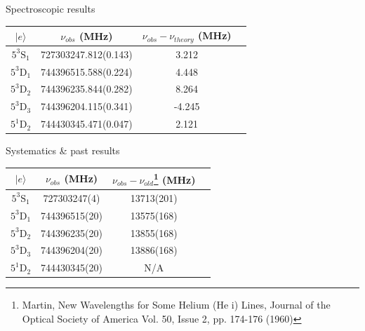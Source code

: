 \documentclass{beamer}
\begin{document}
\begin{frame}{Spectroscopic results}
    \begin{center}
        \begin{tabular}{|c||c|c|c|}
        \hline
            $|e\rangle$ &  $\nu_{obs}$ (MHz)    &$\nu_{obs}-\nu_{theory}$ (MHz) \\
            \hline\hline
            $5^3\mathrm{S}_1$ & 727303247.812(0.143)    & 3.212\\
            $5^3\mathrm{D}_1$ & 744396515.588(0.224)     & 4.448\\
            $5^3\mathrm{D}_2$ & 744396235.844(0.282)   & 8.264\\
            $5^3\mathrm{D}_3$ & 744396204.115(0.341)   &-4.245\\
            $5^1\mathrm{D}_2$ & 744430345.471(0.047)     &	2.121\\
            \hline
        \end{tabular}
\end{center}
\end{frame}
\begin{frame}{Systematics \& past results}
    \begin{center}
        \begin{tabular}{|c||c|c|c|}
        \hline
            $|e\rangle$ &  $\nu_{obs}$ (MHz)     & $ \nu_{obs} - \nu_{old}$\footnote[frame]{Martin, New Wavelengths for Some Helium (He i) Lines, Journal of the Optical Society of America Vol. 50, Issue 2, pp. 174-176 (1960)} (MHz) \\
        \hline\hline
            $5^3\mathrm{S}_1$    & 727303247(4)        & 13713(201)\\
            $5^3\mathrm{D}_1$    & 744396515(20)        & 13575(168)\\
            $5^3\mathrm{D}_2$    & 744396235(20)        & 13855(168)\\
            $5^3\mathrm{D}_3$    & 744396204(20)        & 13886(168)\\
            $5^1\mathrm{D}_2$    & 744430345(20)        & N/A\\
            \hline
        \end{tabular}
    \end{center}
    
\end{frame}
\end{document}
